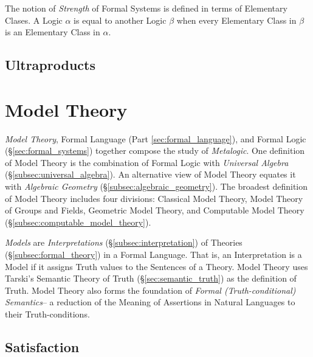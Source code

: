 \documentclass{article}
\begin{document}
The notion of \emph{Strength} of Formal Systems is defined in terms of
Elementary Clases. A Logic $\alpha$ is equal to another Logic $\beta$
when every Elementary Class in $\beta$ is an Elementary Class in
$\alpha$.

\subsection{Ultraproducts}\label{subsec:ultraproducts}



\section{Model Theory}\label{sec:model_theory}

\emph{Model Theory}, Formal Language (Part \ref{sec:formal_language}),
and Formal Logic (\S\ref{sec:formal_systems}) together compose the
study of \emph{Metalogic}. One definition of Model Theory is the
combination of Formal Logic with \emph{Universal Algebra}
(\S\ref{subsec:universal_algebra}). An alternative view of Model
Theory equates it with \emph{Algebraic Geometry}
(\S\ref{subsec:algebraic_geometry}). The broadest definition of Model
Theory includes four divisions: Classical Model Theory, Model Theory
of Groups and Fields, Geometric Model Theory, and Computable Model
Theory (\S\ref{subsec:computable_model_theory}).

\emph{Models} are \emph{Interpretations}
(\S\ref{subsec:interpretation}) of Theories
(\S\ref{subsec:formal_theory}) in a Formal Language. That is, an
Interpretation is a Model if it assigns Truth values to the Sentences
of a Theory. Model Theory uses Tarski's Semantic Theory of Truth
(\S\ref{sec:semantic_truth}) as the definition of Truth. Model Theory
also forms the foundation of \emph{Formal (Truth-conditional)
  Semantics}-- a reduction of the Meaning of Assertions in Natural
Languages to their Truth-conditions.

\subsection{Satisfaction}\label{subsec:satisfaction}
\end{document}
